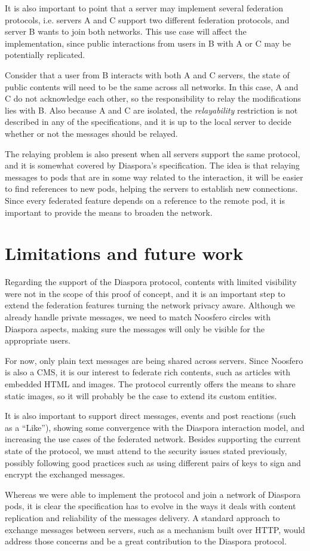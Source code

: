 It is also important to point that a server may implement several federation
protocols, i.e. servers A and C support two different federation protocols,
and server B wants to join both networks. This use case will affect the
implementation, since public interactions from users in B with A or C may be
potentially replicated.

Consider that a user from B interacts with both A and C servers, the
state of public contents will need to be the same across all networks.
In this case, A and C do not acknowledge each other, so the responsibility
to relay the modifications lies with B. Also because A and C are isolated,
the \textit{relayability} restriction is not described in any of the
specifications, and it is up to the local server to decide whether or not
the messages should be relayed.

The relaying problem is also present when all servers support the
same protocol, and it is somewhat covered by Diaspora's specification.
The idea is that relaying messages to pods that are in some way related
to the interaction, it will be easier to find references to new pods,
helping the servers to establish new connections. Since every federated
feature depends on a reference to the remote pod, it is important to
provide the means to broaden the network.


\section{Limitations and future work}

Regarding the support of the Diaspora protocol, contents with limited
visibility were not in the scope of this proof of concept, and it is an
important step to extend the federation features turning the network privacy
aware. Although we already handle private messages, we need to match Noosfero
circles with Diaspora aspects, making sure the messages will only be visible
for the appropriate users.

For now, only plain text messages are being shared across servers. Since
Noosfero is also a CMS, it is our interest to federate rich contents,
such as articles with embedded HTML and images. The protocol currently offers
the means to share static images, so it will probably be the case to extend
its custom entities.

It is also important to support direct messages, events and post reactions
(such as a ``Like''), showing some convergence with the Diaspora interaction
model, and increasing the use cases of the federated network. Besides
supporting the current state of the protocol, we must attend to the security
issues stated previously, possibly following good practices such as using
different pairs of keys to sign and encrypt the exchanged messages.

Whereas we were able to implement the protocol and join a network of Diaspora
pods, it is clear the specification has to evolve in the ways it deals with
content replication and reliability of the messages delivery. A standard
approach to exchange messages between servers, such as a mechanism built over
HTTP, would address those concerns and be a great contribution to the Diaspora
protocol.

